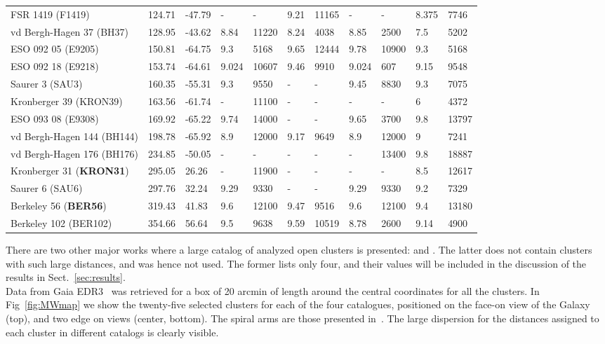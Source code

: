 \documentclass{aa}
\begin{document}
\begin{table}
\begin{tabular}{lllllllllll}
 FSR 1419 (F1419)   & 124.71 & -47.79    & -   & -   & 9.21  & 11165 & -   & -   & 8.375 & 7746  \\
 vd Bergh-Hagen 37 (BH37)    & 128.95 & -43.62    & 8.84  & 11220 & 8.24 
 & 4038  & 8.85  & 2500  & 7.5   & 5202  \\
 ESO 092 05 (E9205)  & 150.81 & -64.75    & 9.3   & 5168  & 9.65  & 12444 &
 9.78  & 10900 & 9.3   & 5168  \\
 ESO 092 18 (E9218)  & 153.74 & -64.61    & 9.024 & 10607 & 9.46  & 9910  &
 9.024 & 607   & 9.15  & 9548  \\
 Saurer 3 (SAU3)   & 160.35 & -55.31    & 9.3   & 9550  & -   & -   & 9.45  &
 8830 & 9.3   & 7075  \\
 Kronberger 39 (KRON39)    & 163.56 & -61.74    & -   & 11100 & -   & -   & -   &
 -   & 6     & 4372  \\
 ESO 093 08 (E9308)  & 169.92 & -65.22    & 9.74  & 14000 & -   & -   & 9.65  &
 3700  & 9.8   & 13797 \\
 vd Bergh-Hagen 144 (BH144)   & 198.78 & -65.92    & 8.9   & 12000 & 9.17
 & 9649  & 8.9   & 12000 & 9     & 7241  \\
 vd Bergh-Hagen 176 (BH176)   & 234.85 & -50.05    & -   & -   & -   & - 
 & -   & 13400 & 9.8   & 18887 \\
 Kronberger 31 (\textbf{KRON31})    & 295.05 & 26.26     & -   & 11900 & -   & -   & -   &
 -   & 8.5   & 12617 \\
 Saurer 6 (SAU6)   & 297.76 & 32.24     & 9.29  & 9330  & -   & -   & 9.29  &
 9330 & 9.2   & 7329  \\
 Berkeley 56 (\textbf{BER56})     & 319.43 & 41.83     & 9.6   & 12100 & 9.47  & 9516  &
 9.6 & 12100 & 9.4   & 13180 \\
 Berkeley 102 (BER102)    & 354.66 & 56.64     & 9.5   & 9638  & 9.59  & 10519 &
 8.78  & 2600  & 9.14  & 4900 \\
 \hline
 \end{tabular}
 \end{table}

 There are two other major works where a large catalog of analyzed open clusters
 is presented: \cite{Lui_2019} and \cite{Dias_2021}. The latter does not contain
 clusters with such large distances, and was hence not used. The former lists
 only four, and their values will be included in the discussion of the results
 in Sect.~\ref{sec:results}.\\

 Data from Gaia EDR3~\citep{Gaia_2016,Gaia_EDR3} was retrieved for a box of 20
 arcmin of length around the central coordinates for all the clusters.
 In Fig~\ref{fig:MWmap} we show the twenty-five selected clusters for each of
 the four catalogues, positioned on the face-on view of the Galaxy (top), and
 two edge on views (center, bottom). The spiral arms are those presented
 in~\cite{Momany_2006}. The large dispersion for the distances
 assigned to each cluster in different catalogs is clearly visible.
\end{document}
